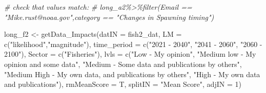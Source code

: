 \documentclass[
]{article}
\newenvironment{Shaded}{\begin{snugshade}}{\end{snugshade}}
\newcommand{\AttributeTok}[1]{\textcolor[rgb]{0.77,0.63,0.00}{#1}}
\newcommand{\CommentTok}[1]{\textcolor[rgb]{0.56,0.35,0.01}{\textit{#1}}}
\newcommand{\DecValTok}[1]{\textcolor[rgb]{0.00,0.00,0.81}{#1}}
\newcommand{\FunctionTok}[1]{\textcolor[rgb]{0.00,0.00,0.00}{#1}}
\newcommand{\NormalTok}[1]{#1}
\newcommand{\OtherTok}[1]{\textcolor[rgb]{0.56,0.35,0.01}{#1}}
\newcommand{\StringTok}[1]{\textcolor[rgb]{0.31,0.60,0.02}{#1}}
\begin{document}
\begin{Shaded}
\begin{Highlighting}[]
    \CommentTok{\# check that values match:}
    \CommentTok{\# long\_a2\%\textgreater{}\%filter(Email == "Mike.rust@noaa.gov",category == "Changes in Spawning timing")}
    
    
\NormalTok{    long\_f2 }\OtherTok{\textless{}{-}} \FunctionTok{getData\_Impacts}\NormalTok{(}\AttributeTok{datIN =}\NormalTok{ fish2\_dat,}
                    \AttributeTok{LM  =} \FunctionTok{c}\NormalTok{(}\StringTok{"likelihood"}\NormalTok{,}\StringTok{"magnitude"}\NormalTok{),}
                    \AttributeTok{time\_period  =} \FunctionTok{c}\NormalTok{(}\StringTok{"2021 {-} 2040"}\NormalTok{, }\StringTok{"2041 {-} 2060"}\NormalTok{, }\StringTok{"2060 {-} 2100"}\NormalTok{),}
                    \AttributeTok{Sector  =} \FunctionTok{c}\NormalTok{(}\StringTok{"Fisheries"}\NormalTok{),}
                    \AttributeTok{lvls  =} \FunctionTok{c}\NormalTok{(}\StringTok{"Low  {-} My opinion"}\NormalTok{,}
                              \StringTok{"Medium low {-} My opinion and some data"}\NormalTok{,}
                              \StringTok{"Medium {-} Some data and publications by others"}\NormalTok{,}
                              \StringTok{"Medium High {-} My own data, and publications by others"}\NormalTok{,}
                              \StringTok{"High {-} My own data and publications"}\NormalTok{),}
                    \AttributeTok{rmMeanScore =}\NormalTok{ T, }
                    \AttributeTok{splitIN =} \StringTok{"Mean Score"}\NormalTok{,}
                    \AttributeTok{adjIN =} \DecValTok{1}\NormalTok{)}
    

\end{Highlighting}
\end{Shaded}
\end{document}
